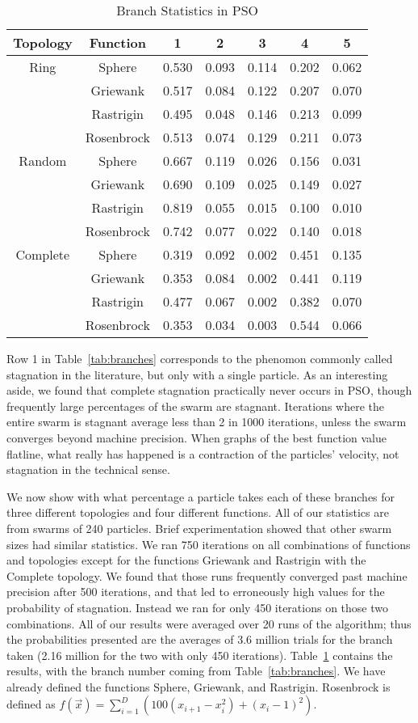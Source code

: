 \documentclass[journal,letterpaper]{IEEEtran}
\begin{document}
\begin{table}
  \caption{Branch Statistics in PSO}
  \label{tab:stats}
  \centering
  \begin{tabular}{c|c|c|c|c|c|c}
	Topology&Function&1&2&3&4&5\\
	\hline
	Ring&Sphere&0.530&0.093&0.114&0.202&0.062\\
	&Griewank&0.517&0.084&0.122&0.207&0.070\\
	&Rastrigin&0.495&0.048&0.146&0.213&0.099\\
	&Rosenbrock&0.513&0.074&0.129&0.211&0.073\\
	\hline
	Random&Sphere&0.667&0.119&0.026&0.156&0.031\\
	&Griewank&0.690&0.109&0.025&0.149&0.027\\
	&Rastrigin&0.819&0.055&0.015&0.100&0.010\\
	&Rosenbrock&0.742&0.077&0.022&0.140&0.018\\
	\hline
	Complete&Sphere&0.319&0.092&0.002&0.451&0.135\\
	&Griewank&0.353&0.084&0.002&0.441&0.119\\
	&Rastrigin&0.477&0.067&0.002&0.382&0.070\\
	&Rosenbrock&0.353&0.034&0.003&0.544&0.066\\
  \end{tabular}
\end{table}

Row 1 in Table~\ref{tab:branches} corresponds to the phenomon commonly called
stagnation in the literature, but only with a single particle.  As an
interesting aside, we found that complete stagnation practically never occurs
in PSO, though frequently large percentages of the swarm are stagnant.
Iterations where the entire swarm is stagnant average less than 2 in 1000
iterations, unless the swarm converges beyond machine precision.  When graphs
of the best function value flatline, what really has happened is a contraction
of the particles' velocity, not stagnation in the technical sense.  

We now show with what percentage a particle takes each of these branches for
three different topologies and four different functions.  All of our statistics
are from swarms of 240 particles.  Brief experimentation showed that other
swarm sizes had similar statistics.  We ran 750 iterations on all combinations
of functions and topologies except for the functions Griewank and Rastrigin
with the Complete topology.  We found that those runs frequently converged past
machine precision after 500 iterations, and that led to erroneously high values
for the probability of stagnation.  Instead we ran for only 450 iterations on
those two combinations.  All of our results were averaged over 20 runs of the
algorithm; thus the probabilities presented are the averages of 3.6 million
trials for the branch taken (2.16 million for the two with only 450
iterations).  Table~\ref{tab:stats} contains the results, with the branch
number coming from Table~\ref{tab:branches}.  We have already defined the
functions Sphere, Griewank, and Rastrigin.  Rosenbrock is defined as
$f(\Vec{x}) = \sum_{i=1}^D \left(100(x_{i+1}-x_i^2)+(x_i-1)^2\right)$.
\end{document}
